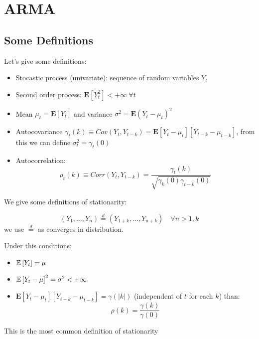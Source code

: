 \chapter{ARMA}
\label{chap:arma}
\section{Some Definitions}
Let's give some definitions:
\begin{itemize}
	\item Stocastic process (univariate): sequence of random variables $Y_t$
	\item Second order process: $\mathbf{E}[Y_t^2] < + \infty \ \forall t$
	\item Mean $\mu_t = \mathbf{E}[Y_t]$ and variance $\sigma^2 = \mathbf{E}(Y_t - \mu_t)^2$
	\item Autocovariance $\gamma_t(k) \equiv Cov(Y_t,Y_{t-k}) = \mathbf{E}[Y_t - \mu_t][Y_{t-k} - \mu_{t-k}]$, from this we can define $\sigma^2_t = \gamma_t(0)$
	\item Autocorrelation:
	\[
	\rho_t(k) \equiv Corr(Y_t,Y_{t-k}) = \frac{\gamma_t(k)}{\sqrt{\gamma_k(0) \gamma_{t-k}(0)}}
	\]
\end{itemize}
We give some definitions of stationarity:
\begin{mydefinition}
\begin{equation}
	(Y_1,\ldots, Y_n) \stackrel{d}{=} (Y_{1+k},\ldots, Y_{n+k}) \quad \forall n>1,k
\end{equation}
we use $\stackrel{d}{=}$ as converges in distribution.
\end{mydefinition}
\newpage
\begin{mydefinition}
Under this conditions:
\begin{itemize}
	\item $\mathbb{E}\left[Y_t\right] = \mu$ 
	\item $\mathbb{E}\left[Y_t -\mu\right]^2 = \sigma^2 < +\infty$
	\item $\mathbf{E}[Y_t - \mu_t][Y_{t-k} - \mu_{t-k}] = \gamma(|k|)$ (independent of $t$ for each $k$)
	than:
	\begin{equation}
	\rho(k) = \frac{\gamma(k)}{\gamma(0)}
	\end{equation}
\end{itemize}
This is the most common definition of stationarity
\end{mydefinition}

